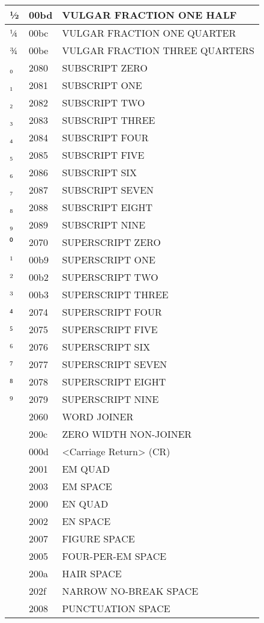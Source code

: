 \documentclass[12pt,letterpaper,openany]{book}
\begin{document}
\begin{center}
\begin{supertabular}{|m{0.25in}|m{0.5in}|m{4in}|}
½ & 00bd & VULGAR FRACTION ONE HALF\\\hline
¼ & 00bc & VULGAR FRACTION ONE QUARTER\\\hline
¾ & 00be & VULGAR FRACTION THREE QUARTERS\\\hline
₀ & 2080 & SUBSCRIPT ZERO\\\hline
₁ & 2081 & SUBSCRIPT ONE\\\hline
₂ & 2082 & SUBSCRIPT TWO\\\hline
₃ & 2083 & SUBSCRIPT THREE\\\hline
₄ & 2084 & SUBSCRIPT FOUR\\\hline
₅ & 2085 & SUBSCRIPT FIVE\\\hline
₆ & 2086 & SUBSCRIPT SIX\\\hline
₇ & 2087 & SUBSCRIPT SEVEN\\\hline
₈ & 2088 & SUBSCRIPT EIGHT\\\hline
₉ & 2089 & SUBSCRIPT NINE\\\hline
⁰ & 2070 & SUPERSCRIPT ZERO\\\hline
¹ & 00b9 & SUPERSCRIPT ONE\\\hline
² & 00b2 & SUPERSCRIPT TWO\\\hline
³ & 00b3 & SUPERSCRIPT THREE\\\hline
⁴ & 2074 & SUPERSCRIPT FOUR\\\hline
⁵ & 2075 & SUPERSCRIPT FIVE\\\hline
⁶ & 2076 & SUPERSCRIPT SIX\\\hline
⁷ & 2077 & SUPERSCRIPT SEVEN\\\hline
⁸ & 2078 & SUPERSCRIPT EIGHT\\\hline
⁹ & 2079 & SUPERSCRIPT NINE\\\hline
⁠ & 2060 & WORD JOINER\\\hline
‌ & 200c & ZERO WIDTH NON-JOINER\\\hline
 & 000d & <Carriage Return> (CR)\\\hline
  & 2001 & EM QUAD\\\hline
  & 2003 & EM SPACE\\\hline
  & 2000 & EN QUAD\\\hline
  & 2002 & EN SPACE\\\hline
  & 2007 & FIGURE SPACE\\\hline
  & 2005 & FOUR-PER-EM SPACE\\\hline
  & 200a & HAIR SPACE\\\hline
  & 202f & NARROW NO-BREAK SPACE\\\hline
  & 2008 & PUNCTUATION SPACE\\\hline

\end{supertabular}
\end{center}
\end{document}
